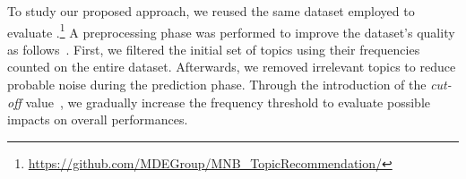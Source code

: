 








To study our proposed approach, we reused the same dataset employed to evaluate \MNB.\footnote{\url{https://github.com/MDEGroup/MNB\_TopicRecommendation/}} A preprocessing phase was performed to improve the dataset's quality as follows~\cite{repo-topix}. First, we filtered the initial set of topics using their frequencies counted on the entire \GH dataset. Afterwards, we removed irrelevant topics to reduce probable noise during the prediction phase. Through the introduction of the \emph{cut-off} value~\cite{10.1145/3383219.3383227}, we gradually increase the frequency threshold to evaluate possible impacts on overall performances. %


